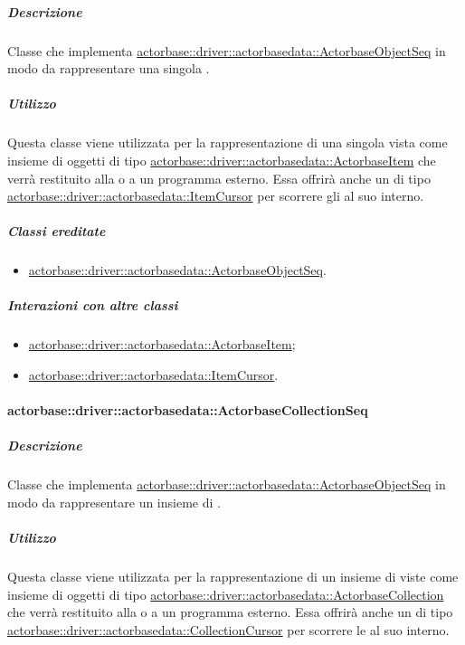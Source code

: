 \documentclass{scalatekids-article}
\begin{document}
\subparagraph{Descrizione}

Classe che implementa \hyperref[sec:actorbase::driver::actorbasedata::ActorbaseObjectSeq]{actorbase::driver::actorbasedata::ActorbaseObjectSeq}
in modo da rappresentare una singola .

\subparagraph{Utilizzo}

Questa classe viene utilizzata per la rappresentazione di una singola
 vista come insieme di oggetti di tipo
\hyperref[sec:actorbase::driver::actorbasedata::ActorbaseItem]{actorbase::driver::actorbasedata::ActorbaseItem}
che verrà restituito alla  o a un programma esterno.
Essa offrirà anche un  di tipo
\hyperref[sec:actorbase::driver::actorbasedata::ItemCursor]{actorbase::driver::actorbasedata::ItemCursor}
per scorrere gli  al suo interno.

\subparagraph{Classi ereditate}

\begin{itemize}
\item \hyperref[sec:actorbase::driver::actorbasedata::ActorbaseObjectSeq]{actorbase::driver::actorbasedata::ActorbaseObjectSeq}.
\end{itemize}

\subparagraph{Interazioni con altre classi}

\begin{itemize}
\item \hyperref[sec:actorbase::driver::actorbasedata::ActorbaseItem]{actorbase::driver::actorbasedata::ActorbaseItem};
\item \hyperref[sec:actorbase::driver::actorbasedata::ItemCursor]{actorbase::driver::actorbasedata::ItemCursor}.
\end{itemize}

\paragraph{actorbase::driver::actorbasedata::ActorbaseCollectionSeq}
\label{sec:actorbase::driver::actorbasedata::ActorbaseCollectionSeq}

\subparagraph{Descrizione}

Classe che implementa \hyperref[sec:actorbase::driver::actorbasedata::ActorbaseObjectSeq]{actorbase::driver::actorbasedata::\allowbreak{}ActorbaseObjectSeq}
in modo da rappresentare un insieme di .

\subparagraph{Utilizzo}

Questa classe viene utilizzata per la rappresentazione di un insieme di
 viste come insieme di oggetti di tipo
\hyperref[sec:actorbase::driver::actorbasedata::ActorbaseCollection]{actorbase::driver::actorbasedata::ActorbaseCollection}
che verrà restituito alla  o a un programma esterno.
Essa offrirà anche un  di tipo
\hyperref[sec:actorbase::driver::actorbasedata::CollectionCursor]{actorbase::driver::actorbasedata::CollectionCursor}
per scorrere le  al suo interno.
\end{document}
